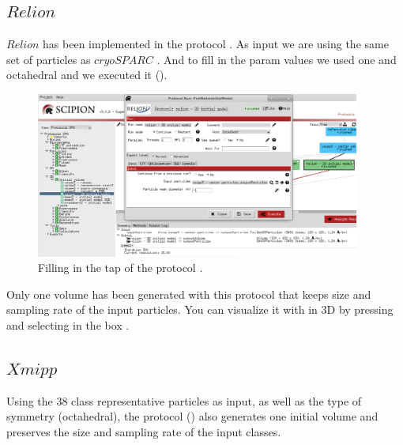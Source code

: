 \subsection*{$Relion$ }
$Relion$  has been implemented in the protocol . As input we are using the same set of particles as $cryoSPARC$ . And to fill in the param values we used one  and octahedral  and we executed it (). 

\begin{figure}[H]
  \centering
  \captionsetup{width=.8\linewidth} 
  \includegraphics[width=0.95\textwidth]
  {images/8c_relion3DInitialModel.pdf}
  \caption{Filling in the  tap of the protocol .}
  \label{fig:initial_vol_2}
  \end{figure}

  Only one volume has been generated with this protocol that keeps size and sampling rate of the input particles. You can visualize it with \chimera in 3D by pressing  and selecting in the  box  . 
  
\subsection*{$Xmipp$}
Using the 38 class representative particles as input, as well as the type of symmetry (octahedral), the protocol  () also generates one initial volume and preserves the size and sampling rate of the input  classes.

